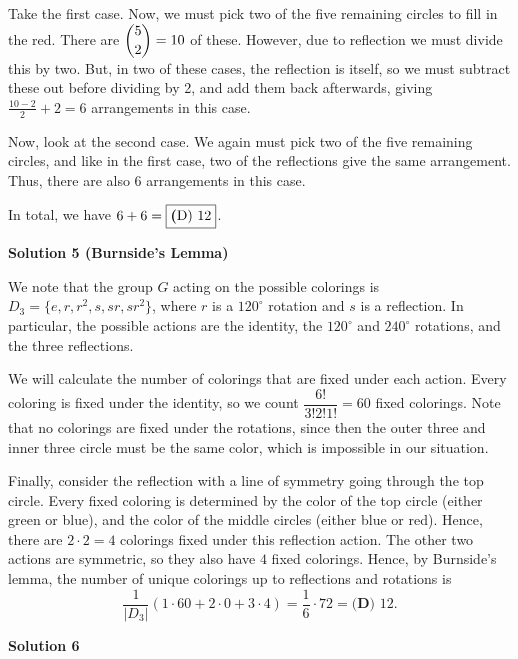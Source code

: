\begin{enumerate}
 Take the first case. Now, we must pick two of the five remaining circles to fill in the red. There are $\dbinom{5}{2}=10$ of these. However, due to reflection we must divide this by two. But, in two of these cases, the reflection is itself, so we must subtract these out before dividing by 2, and add them back afterwards, giving $\frac{10-2}{2}+2=6$ arrangements in this case.

 Now, look at the second case. We again must pick two of the five remaining circles, and like in the first case, two of the reflections give the same arrangement. Thus, there are also $6$ arrangements in this case. 

 In total, we have $6+6=\boxed{\text{\textbf(D) }12}$.

 



\textbf{Solution 5 (Burnside's Lemma)}

We note that the group $G$ acting on the possible colorings is $D_3 = \{e, r, r^2, s, sr, sr^2\}$, where $r$ is a $120^\circ$ rotation and $s$ is a reflection. In particular, the possible actions are the identity, the $120^\circ$ and $240^\circ$ rotations, and the three reflections. 

 We will calculate the number of colorings that are fixed under each action. Every coloring is fixed under the identity, so we count $\dfrac{6!}{3!2!1!} = 60$ fixed colorings. Note that no colorings are fixed under the rotations, since then the outer three and inner three circle must be the same color, which is impossible in our situation. 

 Finally, consider the reflection with a line of symmetry going through the top circle. Every fixed coloring is determined by the color of the top circle (either green or blue), and the color of the middle circles (either blue or red). Hence, there are $2\cdot 2 = 4$ colorings fixed under this reflection action. The other two actions are symmetric, so they also have $4$ fixed colorings. Hence, by Burnside's lemma, the number of unique colorings up to reflections and rotations is 
 \[\dfrac{1}{|D_3|} (1\cdot 60 + 2\cdot 0 + 3\cdot 4) = \dfrac{1}{6}\cdot 72 = \boxed{\textbf{(D)  } 12}.\]




\textbf{Solution 6}


\end{enumerate}
